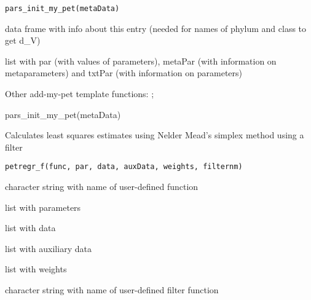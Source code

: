 \documentclass[a4paper]{book}
\begin{document}
%
\begin{Usage}
\begin{verbatim}
pars_init_my_pet(metaData)
\end{verbatim}
\end{Usage}
%
\begin{Arguments}
\begin{ldescription}
\item[\code{metaData}] data frame with info about this entry (needed for names of phylum and class to get d\_V)
\end{ldescription}
\end{Arguments}
%
\begin{Value}
list with par (with values of parameters), metaPar (with information on metaparameters) and txtPar (with information on parameters)
\end{Value}
%
\begin{SeeAlso}\relax
Other add-my-pet template functions: ;
\end{SeeAlso}
%
\begin{Examples}
\begin{ExampleCode}
pars_init_my_pet(metaData)
\end{ExampleCode}
\end{Examples}
%
\begin{Description}\relax
Calculates least squares estimates using Nelder Mead's simplex method using a filter
\end{Description}
%
\begin{Usage}
\begin{verbatim}
petregr_f(func, par, data, auxData, weights, filternm)
\end{verbatim}
\end{Usage}
%
\begin{Arguments}
\begin{ldescription}
\item[\code{func}] character string with name of user-defined function

\item[\code{par}] list with parameters

\item[\code{data}] list with data

\item[\code{auxData}] list with auxiliary data

\item[\code{weights}] list with weights

\item[\code{filternm}] character string with name of user-defined filter function
\end{ldescription}
\end{Arguments}
\end{document}
